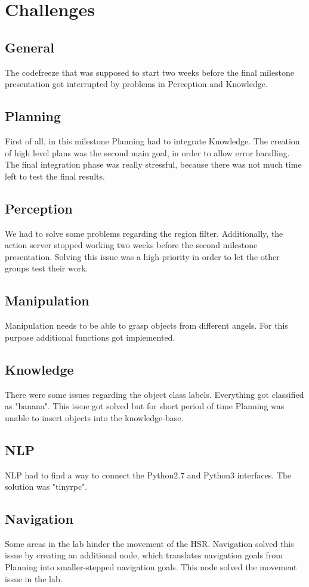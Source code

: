 \documentclass[main.tex]{subfiles}
\begin{document}
	
	\chapter{Challenges}

	\section{General}
	The codefreeze that was supposed to start two weeks before the final milestone presentation got interrupted by
	problems in Perception and Knowledge. 	

	\section{Planning}
	First of all, in this milestone Planning had to integrate Knowledge. The creation of high level plans was the second main goal,
	in order to allow error handling.
	The final integration phase was really stressful, because there was not much time left to test the final results.

	\section{Perception}
	We had to solve some problems regarding the region filter.
	Additionally, the action server stopped working two weeks before the second milestone presentation.
	Solving this issue was a high priority in order to let the other groups test their work.	

	\section{Manipulation}
	Manipulation needs to be able to grasp objects from different angels.
	For this purpose additional functions got implemented.
	
	\section{Knowledge}
	There were some issues regarding the object class labels. Everything got classified as "banana".
	This issue got solved but for short period of time Planning was unable to insert objects into
	the knowledge-base.

	\section{NLP}
	NLP had to find a way to connect the Python2.7 and Python3 interfaces.
	The solution was "tinyrpc".

	\section{Navigation}
	Some areas in the lab hinder the movement of the HSR. Navigation solved this issue by creating
	an additional node, which translates navigation goals from Planning into smaller-stepped navigation goals.
	This node solved the movement issue in the lab.

	\newpage
		
\end{document}
